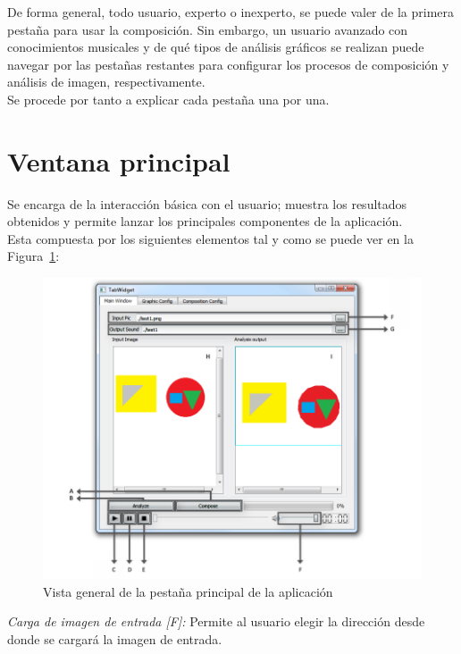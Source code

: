 		De forma general, todo usuario, experto o inexperto, se puede valer de la primera pestaña para usar la composición. Sin embargo, un usuario avanzado con conocimientos musicales y de qué tipos de análisis gráficos se realizan puede navegar por las pestañas restantes para configurar los procesos de composición y análisis de imagen, respectivamente.\\
		
		Se procede por tanto a explicar cada pestaña una por una.

	\section{Ventana principal}
		
		Se encarga de la interacción básica con el usuario; muestra los resultados obtenidos y permite lanzar los principales componentes de la aplicación. 
		\\Esta compuesta por los siguientes elementos tal y como se puede ver en la Figura~\ref{fig:interfaz}:\\
		
		
		\begin{figure}[htbp]
		\centering
		\hspace*{-0.5in}
		\includegraphics[scale=0.50]{graphics/interfaz.png}
		\caption{Vista general de la pestaña principal de la aplicación}
		\label{fig:interfaz}
		\end{figure}
		
		\noindent\textit{Carga de imagen de entrada [F]:} Permite al usuario elegir la dirección desde donde se cargará la imagen de entrada.\\
		
